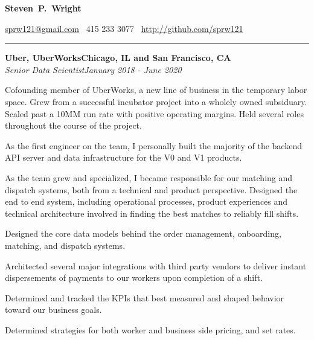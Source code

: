 \documentclass{article}
\newcommand{\ressection}[1]{\noindent{\large\textbf{#1}}\vspace{2pt}\hrule\vspace{4pt}}
\newcommand{\leftandright}[2]{\noindent\textbf{#1}\hfill\textbf{#2}}
\newcommand{\leftandrighti}[2]{\indent\textit{#1}\hfill\textit{#2}}
\begin{document}
\sffamily

\begin{center}
\textbf{\huge{Steven~P.~Wright}}

\href{mailto:sprw121@gmail.com}{sprw121@gmail.com}
\textbullet\, 415 233 3077
\textbullet\, \href{https://github.com/sprw121}{http://github.com/sprw121}
\end{center}

\ressection{Work experience}

\leftandright{Uber, UberWorks}{Chicago, IL and San Francisco, CA} \\
\leftandrighti{Senior Data Scientist}
	      {January 2018 - June 2020}
\begin{itemize*}
\item Cofounding member of UberWorks, a new line of business in the temporary labor space. Grew from a successful incubator project into a wholely owned subsiduary. Scaled past a 10MM run rate with positive operating margins. Held several roles throughout the course of the project.
\item As the first engineer on the team, I personally built the majority of the backend API server and data infrastructure for the V0 and V1 products.
\item As the team grew and specialized, I became responsible for our matching and dispatch systems, both from a technical and product perspective. Designed the end to end system, including operational processes, product experiences and technical architecture involved in finding the best matches to reliably fill shifts.
\item Designed the core data models behind the order management, onboarding, matching, and dispatch systems.
\item Architected several major integrations with third party vendors to deliver instant dispersements of payments to our workers upon completion of a shift.
\item Determined and tracked the KPIs that best measured and shaped behavior toward our business goals.
\item Determined strategies for both worker and business side pricing, and set rates.
\end{itemize*}
\end{document}

